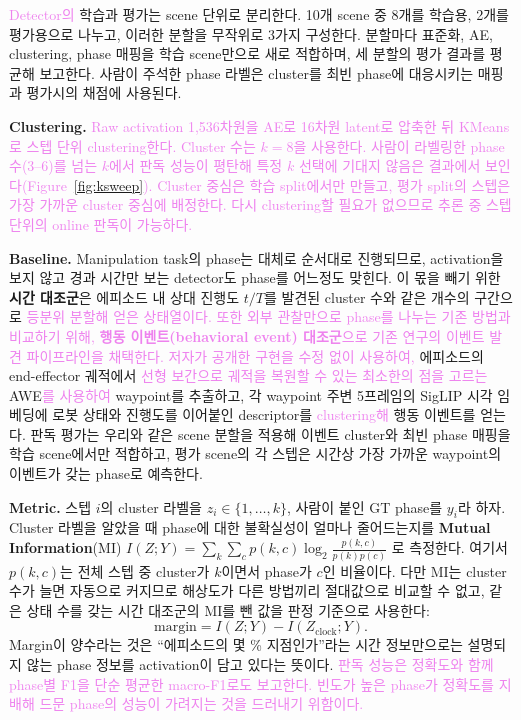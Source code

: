\documentclass[a4paper,twocolumn,9pt]{extarticle}
\newcommand{\rev}[1]{\textcolor{violet}{#1}}  %
\begin{document}
\rev{Detector의} 학습과 평가는 scene 단위로 분리한다. 10개 scene 중 8개를 학습용, 2개를 평가용으로 나누고, 이러한 분할을 무작위로 3가지 구성한다. 분할마다 표준화, AE, clustering, phase 매핑을 학습 scene만으로 새로 적합하며, 세 분할의 평가 결과를 평균해 보고한다.  사람이 주석한 phase 라벨은 cluster를 최빈 phase에 대응시키는 매핑과 평가시의 채점에 사용된다.

\textbf{Clustering.} \rev{Raw activation 1{,}536차원을 AE로 16차원 latent로 압축한 뒤 KMeans로 스텝 단위 clustering한다. \rev{Cluster 수는 $k=8$을 사용한다. 사람이 라벨링한 phase 수(3--6)를 넘는 $k$에서 판독 성능이 평탄해 특정 $k$ 선택에 기대지 않음은 결과에서 보인다(Figure~\ref{fig:ksweep}).} Cluster 중심은 학습 split에서만 만들고, 평가 split의 스텝은 가장 가까운 cluster 중심에 배정한다. \rev{다시 clustering할 필요가 없으므로} 추론 중 스텝 단위의 online 판독이 가능하다.}

\textbf{Baseline.} Manipulation task의 phase는 대체로 순서대로 진행되므로, activation을 보지 않고 경과 시간만 보는 detector도 phase를 어느정도 맞힌다. 이 몫을 빼기 위한 \textbf{시간 대조군}은 에피소드 내 상대 진행도 $t/T$를 발견된 cluster
수와 같은 개수의 구간으로 \rev{등분위 분할해 얻은 상태열이다.} \rev{또한 외부 관찰만으로 phase를 나누는 기존 방법과 비교하기 위해, \textbf{행동 이벤트(behavioral event) 대조군}으로 기존 연구\cite{egsae}의 이벤트 발견 파이프라인을 채택한다. 저자가 공개한 구현을 수정 없이 사용하여,} 에피소드의 end-effector 궤적에서 \rev{선형 보간으로 궤적을 복원할 수 있는 최소한의 점을 고르는} AWE\cite{awe}\rev{를 사용하여} waypoint를 추출하고, 각 waypoint 주변
5프레임의 SigLIP\cite{siglip} 시각 임베딩에 로봇 상태와 진행도를 이어붙인 descriptor를 \rev{clustering해}
행동 이벤트를 얻는다. 판독 평가는 우리와 같은 scene 분할을 적용해 이벤트 cluster와 최빈
phase 매핑을 학습 scene에서만 적합하고, 평가 scene의 각 스텝은 시간상 가장 가까운
waypoint의 이벤트가 갖는 phase로 예측한다.

\textbf{Metric.} 스텝 $i$의 cluster 라벨을 $z_i \in \{1,\dots,k\}$, 사람이 붙인 GT phase를 $y_i$라 하자. Cluster 라벨을 알았을 때 phase에 대한 불확실성이 얼마나 줄어드는지를 \textbf{Mutual Information}(MI) $I(Z;Y)=\sum_{k}\sum_{c} p(k,c)\log_2\frac{p(k,c)}{p(k)p(c)}$ 로 측정한다. 여기서 $p(k,c)$는 전체 스텝 중 cluster가 $k$이면서 phase가 $c$인 비율이다. 다만 MI는 cluster 수가 늘면 자동으로 커지므로 해상도가 다른 방법끼리 절대값으로 비교할 수 없고, 같은 상태 수를 갖는 시간 대조군의 MI를 뺀 값을 판정 기준으로 사용한다:
\begin{equation}
\mathrm{margin} = I(Z;Y) - I(Z_{\mathrm{clock}};Y).
\label{eq:margin}
\end{equation}
Margin이 양수라는 것은 ``에피소드의 몇 \% 지점인가''라는 시간 정보만으로는 설명되지 않는 phase 정보를 activation이 담고 있다는 뜻이다. \rev{판독 성능은 정확도와 함께 phase별 F1을 단순 평균한 macro-F1로도 보고한다. 빈도가 높은 phase가 정확도를 지배해 드문 phase의 성능이 가려지는 것을 드러내기 위함이다.}
\end{document}
